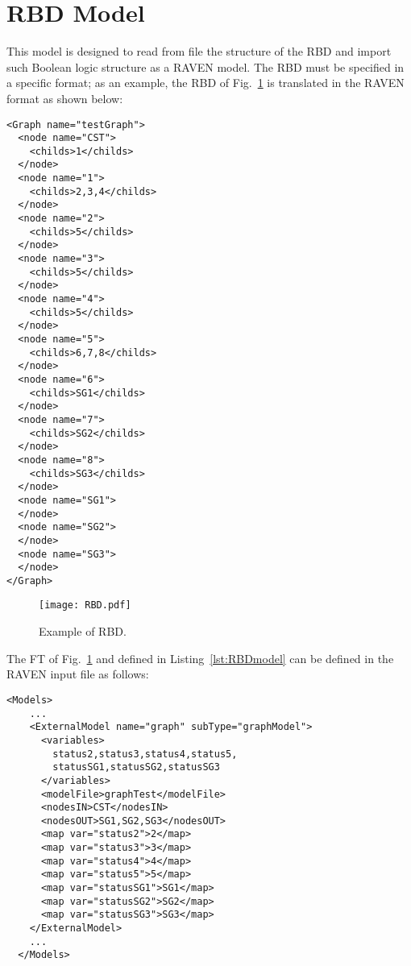 \section{RBD Model}
\label{sec:RBDmodel}

This model is designed to read from file the structure of the RBD and import such Boolean logic structure as a RAVEN model.
The RBD must be specified in a specific format; as an example, the RBD of Fig.~\ref{fig:RBD} is translated in the RAVEN format as shown below:

\begin{lstlisting}[style=XML,morekeywords={anAttribute},caption=RBD input file., label=lst:RBDmodel]
<Graph name="testGraph">
  <node name="CST">
    <childs>1</childs>
  </node>
  <node name="1">
    <childs>2,3,4</childs>
  </node>
  <node name="2">
    <childs>5</childs>
  </node>
  <node name="3">
    <childs>5</childs>
  </node>
  <node name="4">
    <childs>5</childs>
  </node>
  <node name="5">
    <childs>6,7,8</childs>
  </node>
  <node name="6">
    <childs>SG1</childs>
  </node>
  <node name="7">
    <childs>SG2</childs>
  </node>
  <node name="8">
    <childs>SG3</childs>
  </node>
  <node name="SG1">
  </node>
  <node name="SG2">
  </node>
  <node name="SG3">
  </node>
</Graph>
\end{lstlisting} 

\begin{figure}
    \centering
    \centerline{\texttt{[image: RBD.pdf]}} 
    \caption{Example of RBD.}
    \label{fig:RBD}
\end{figure}

The FT of Fig.~\ref{fig:RBD} and defined in Listing~\ref{lst:RBDmodel} can be defined in the RAVEN input file as follows:

\begin{lstlisting}[style=XML,morekeywords={anAttribute},caption=RBD model input example., label=lst:RBD_InputExample]
  <Models> 
    ...
    <ExternalModel name="graph" subType="graphModel">
      <variables>
        status2,status3,status4,status5,
        statusSG1,statusSG2,statusSG3
      </variables>
      <modelFile>graphTest</modelFile>
      <nodesIN>CST</nodesIN>
      <nodesOUT>SG1,SG2,SG3</nodesOUT>
      <map var="status2">2</map>
      <map var="status3">3</map>
      <map var="status4">4</map>
      <map var="status5">5</map>
      <map var="statusSG1">SG1</map>
      <map var="statusSG2">SG2</map>
      <map var="statusSG3">SG3</map>
    </ExternalModel>
    ...
  </Models>
\end{lstlisting}

